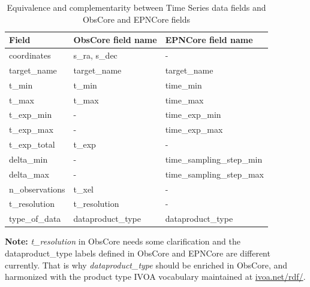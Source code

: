 \documentclass[11pt,a4paper]{ivoa}
\begin{document}
\begin{table}[!htb]
  \begin{center}
  \begin{small}
  \caption{Equivalence and complementarity between Time Series data fields and ObsCore and EPNCore fields}
   \label{tab:obs_epn}
  \begin{tabular}{|l|l|l|}
\hline
    \textbf{Field}      & \textbf{ObsCore field name} & \textbf{EPNCore field name}  \\%
\hline
    coordinates     & s\_ra, s\_dec          & -                         \\
    \hline
    target\_name    & target\_name           & target\_name              \\
    \hline
    t\_min          & t\_min                 & time\_min                 \\
    \hline
    t\_max          & t\_max                 & time\_max                 \\
    \hline
    t\_exp\_min     &  -                     & time\_exp\_min            \\
    \hline
    t\_exp\_max     &  -                     & time\_exp\_max            \\
    \hline
    t\_exp\_total   &  t\_exp                & -                         \\
    \hline
    delta\_min      &  -                     & time\_sampling\_step\_min \\
    \hline
    delta\_max      &  -                     & time\_sampling\_step\_max \\
    \hline
    n\_observations & t\_xel                 & -                         \\
    \hline
     t\_resolution   & t\_resolution      & -                         \\
    type\_of\_data  & dataproduct\_type & dataproduct\_type         \\
\hline
  \end{tabular}
  \end{small}

  \end{center}
 \end{table}

\textbf{ Note:}  \emph{t\_resolution} in ObsCore needs some clarification and the dataproduct\_type labels defined in ObsCore and EPNCore are different currently.
That is why \emph{dataproduct\_type} should be enriched in ObsCore, and harmonized with the product type IVOA vocabulary maintained at \url{ivoa.net/rdf/}.
\end{document}
